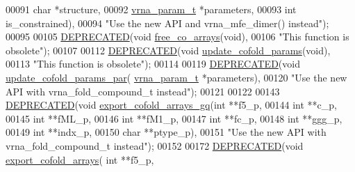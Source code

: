 \begin{DoxyCode}
00091             \textcolor{keywordtype}{char} *structure,
00092             \mbox{\hyperlink{group__energy__parameters_structvrna__param__s}{vrna\_param\_t}} *parameters,
00093             \textcolor{keywordtype}{int} is\_constrained),
00094             \textcolor{stringliteral}{"Use the new API and vrna\_mfe\_dimer() instead"});
00095 
00105 \mbox{\hyperlink{cofold_8h_aab347a3c03fbe8e7319551b9fa0cce4a}{DEPRECATED}}(\textcolor{keywordtype}{void} \mbox{\hyperlink{group__mfe__cofold_gaafb33d7473eb9af9d1b168ca8761c41a}{free\_co\_arrays}}(\textcolor{keywordtype}{void}),
00106           \textcolor{stringliteral}{"This function is obsolete"});
00107 
00112 \mbox{\hyperlink{cofold_8h_aab347a3c03fbe8e7319551b9fa0cce4a}{DEPRECATED}}(\textcolor{keywordtype}{void} \mbox{\hyperlink{group__mfe__cofold_ga4fcbf34e77b99bfbb2333d2ab0c41a57}{update\_cofold\_params}}(\textcolor{keywordtype}{void}),
00113           \textcolor{stringliteral}{"This function is obsolete"});
00114 
00119 \mbox{\hyperlink{cofold_8h_aab347a3c03fbe8e7319551b9fa0cce4a}{DEPRECATED}}(\textcolor{keywordtype}{void} \mbox{\hyperlink{group__mfe__cofold_gaaadbd28b4e428710529ab4098fdacad3}{update\_cofold\_params\_par}}(
      \mbox{\hyperlink{group__energy__parameters_structvrna__param__s}{vrna\_param\_t}} *parameters),
00120           \textcolor{stringliteral}{"Use the new API with vrna\_fold\_compound\_t instead"});
00121 
00122 
00143 \mbox{\hyperlink{cofold_8h_aab347a3c03fbe8e7319551b9fa0cce4a}{DEPRECATED}}(\textcolor{keywordtype}{void} \mbox{\hyperlink{group__mfe__cofold_ga5f5bf4df35d0554f6ace9579f8744c48}{export\_cofold\_arrays\_gq}}(\textcolor{keywordtype}{int} **f5\_p,
00144                                         \textcolor{keywordtype}{int} **c\_p,
00145                                         \textcolor{keywordtype}{int} **fML\_p,
00146                                         \textcolor{keywordtype}{int} **fM1\_p,
00147                                         \textcolor{keywordtype}{int} **fc\_p,
00148                                         \textcolor{keywordtype}{int} **ggg\_p,
00149                                         \textcolor{keywordtype}{int} **indx\_p,
00150                                         \textcolor{keywordtype}{char} **ptype\_p),
00151           \textcolor{stringliteral}{"Use the new API with vrna\_fold\_compound\_t instead"});
00152 
00172 \mbox{\hyperlink{cofold_8h_aab347a3c03fbe8e7319551b9fa0cce4a}{DEPRECATED}}(\textcolor{keywordtype}{void} \mbox{\hyperlink{group__mfe__cofold_ga5cb6b59983f1f74ccc00b9b9c4e84482}{export\_cofold\_arrays}}( \textcolor{keywordtype}{int} **f5\_p,

\end{DoxyCode}
